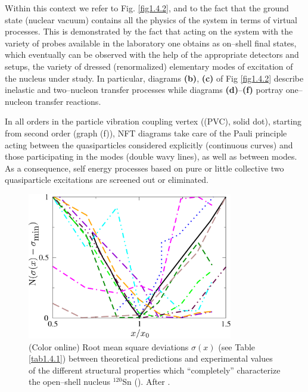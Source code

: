 Within this context we refer to Fig. \ref{fig1.4.2}, and to the fact that the ground state (nuclear vacuum)  contains   all the physics of the system in terms of virtual processes. This is demonstrated by the fact that acting on  the system with the variety of probes available in the laboratory one obtains as on--shell final states, which eventually can be observed with the help of the appropriate detectors and setups, the variety of dressed (renormalized) elementary modes of excitation of the nucleus under study. In particular, diagrams \textbf{(b)}, \textbf{(c)} of Fig \ref{fig1.4.2} describe inelastic and two--nucleon transfer processes while diagrams  \textbf{(d)}--\textbf{(f)} portray  one--nucleon transfer reactions. 


In all orders in the particle vibration coupling vertex ((PVC), solid dot), starting from second order (graph (f)), NFT diagrams take care of the  Pauli principle acting between the quasiparticles considered explicitly (continuous curves) and those participating in the modes (double wavy lines), as well as between modes. As a consequence, self energy processes based on pure or  little collective two quasiparticle excitations are  screened out or eliminated.

\begin{figure}
\begin{center}
\includegraphics[width=0.8\textwidth]{introduccion/figs/funnel_norm_tot_try.pdf}
\caption{(Color online)
Root mean square deviations $\sigma(x)$ (see Table \ref{tab1.4.1}) between theoretical predictions and experimental values of the different structural properties which ``completely'' characterize the open--shell nucleus $^{120}$Sn (\cite{Idini:15}). After \cite{Broglia:16}.}\label{fig1.4.1x}
\end{center}
\end{figure}


